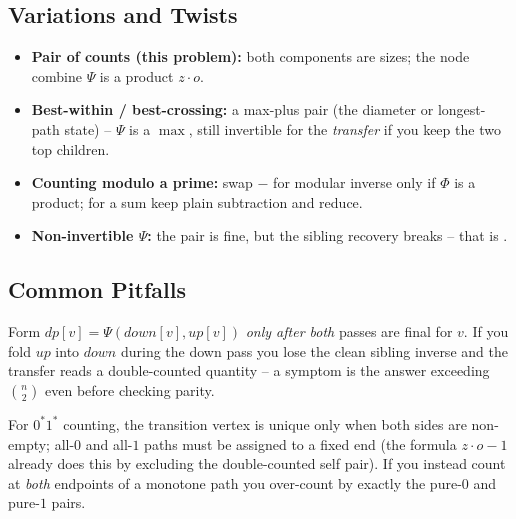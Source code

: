\subsection{Variations and Twists}

\begin{itemize}[nosep]
  \item \textbf{Pair of counts (this problem):} both components are sizes; the
        node combine $\Psi$ is a product $z\!\cdot\!o$. \hfill{}
  \item \textbf{Best-within / best-crossing:} a max-plus pair (the diameter or
        longest-path state) -- $\Psi$ is a $\max$, still invertible for the
        \emph{transfer} if you keep the two top children. \hfill{}
  \item \textbf{Counting modulo a prime:} swap $-$ for modular inverse only if
        $\Phi$ is a product; for a sum keep plain subtraction and reduce.
        \hfill{}
  \item \textbf{Non-invertible $\Psi$:} the pair is fine, but the sibling
        recovery breaks -- that is . \hfill{}
\end{itemize}

\subsection{Common Pitfalls}

\begin{warningbox}
Form $\mathit{dp}[v]=\Psi(\mathit{down}[v],\mathit{up}[v])$ \emph{only after
both} passes are final for $v$. If you fold $\mathit{up}$ into $\mathit{down}$
during the down pass you lose the clean sibling inverse and the transfer reads
a double-counted quantity -- a symptom is the answer exceeding $\binom{n}{2}$
even before checking parity.
\end{warningbox}

\begin{warningbox}
For $0^{\ast}1^{\ast}$ counting, the transition vertex is unique only when both
sides are non-empty; all-$0$ and all-$1$ paths must be assigned to a fixed end
(the formula $z\!\cdot\!o-1$ already does this by excluding the double-counted
self pair). If you instead count at \emph{both} endpoints of a monotone path
you over-count by exactly the pure-$0$ and pure-$1$ pairs.
\end{warningbox}

